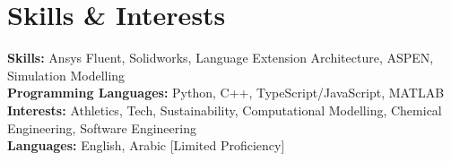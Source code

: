 \documentclass[letterpaper,11pt]{article}
\begin{document}
\section{Skills \& Interests}
 \begin{itemize}[leftmargin=0.15in, label={}]
    \small{\item{
    \vspace{1mm}
     \textbf{Skills: }{Ansys Fluent, Solidworks, Language Extension Architecture, ASPEN, Simulation Modelling} \\
     \vspace{1mm}
     \textbf{Programming Languages: }{Python, C++, TypeScript/JavaScript, MATLAB} \\
     \vspace{1mm}
     \textbf{Interests: }{Athletics, Tech, Sustainability, Computational Modelling, Chemical Engineering, Software Engineering} \\
     \textbf{Languages: }{English, Arabic [Limited Proficiency]}
     \vspace{1mm}

    }}
 \end{itemize}
\end{document}
